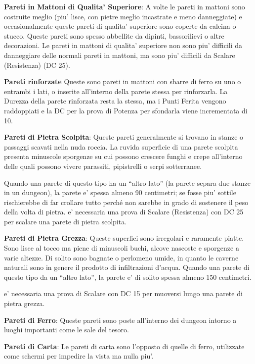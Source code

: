 \documentclass[a4paper,11pt,twoside,openany]{dndbook}
\begin{document}
{\textbf{Pareti in Mattoni di Qualita' Superiore}: A volte le pareti in mattoni sono costruite meglio (piu' lisce, con pietre meglio incastrate e meno danneggiate) e occasionalmente queste pareti di qualita' superiore sono coperte da calcina o stucco. Queste pareti sono spesso abbellite da dipinti, bassorilievi o altre decorazioni. Le pareti in mattoni di qualita' superiore non sono piu' difficili da danneggiare delle normali pareti in mattoni, ma sono piu' difficili da Scalare (Resistenza) (DC 25).

\textbf{Pareti rinforzate} Queste sono pareti in mattoni con sbarre di ferro su uno o entrambi i lati, o inserite all’interno della parete stessa per rinforzarla. La Durezza della parete rinforzata resta la stessa, ma i Punti Ferita vengono raddoppiati e la DC per la prova di Potenza per sfondarla viene incrementata di 10.

\textbf{Pareti di Pietra Scolpita}: Queste pareti generalmente si trovano in stanze o passaggi scavati nella nuda roccia. La ruvida superficie di una parete scolpita presenta minuscole sporgenze su cui possono crescere funghi e crepe all'interno delle quali possono vivere parassiti, pipistrelli o serpi sotterranee. 

Quando una parete di questo tipo ha un ``altro lato'' (la parete separa due stanze in un dungeon), la parete e' spessa almeno 90 centimetri; se fosse piu' sottile rischierebbe di far crollare tutto perché non sarebbe in grado di sostenere il peso della volta di pietra. e' necessaria una prova di Scalare (Resistenza) con DC 25 per scalare una parete di pietra scolpita.

\textbf{Pareti di Pietra Grezza}: Queste superfici sono irregolari e raramente piatte. Sono lisce al tocco ma piene di minuscoli buchi, alcove nascoste e sporgenze a varie altezze. Di solito sono bagnate o perlomeno umide, in quanto le caverne naturali sono in genere il prodotto di infiltrazioni d'acqua. Quando una parete di questo tipo da un ``altro lato'', la parete e' di solito spessa almeno 150 centimetri.

e' necessaria una prova di Scalare con DC 15 per muoversi lungo una parete di pietra grezza.

\textbf{Pareti di Ferro}: Queste pareti sono poste all'interno dei dungeon intorno a luoghi importanti come le sale del tesoro.

\textbf{Pareti di Carta}: Le pareti di carta sono l'opposto di quelle di ferro, utilizzate come schermi per impedire la vista ma nulla piu'.

}
\end{document}
